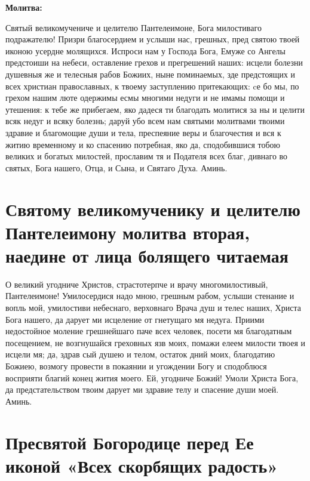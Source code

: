 \bfseries Молитва:\normalfont{}\nopagebreak


Святый великомучениче и целителю Пантелеимоне, Бога милостиваго подражателю! Призри благосердием и услыши нас, грешных, пред святою твоей иконою усердне молящихся. Испроси нам у Господа Бога, Емуже со Ангелы предстоиши на небеси, оставление грехов и прегрешений наших: исцели болезни душевныя же и телесныя рабов Божиих, ныне поминаемых, зде предстоящих и всех христиан православных, к твоему заступлению притекающих: cе бо мы, по грехом нашим люте одержимы есмы многими недуги и не имамы помощи и утешения: к тебе же прибегаем, яко дадеся ти благодать молитися за ны и целити всяк недуг и всяку болезнь; даруй убо всем нам святыми молитвами твоими здравие и благомощие души и тела, преспеяние веры и благочестия и вся к житию временному и ко спасению потребная, яко да, сподобившися тобою великих и богатых милостей, прославим тя и Подателя всех благ, дивнаго во святых, Бога нашего, Отца, и Сына, и Святаго Духа. Аминь.





\section{Святому великомученику и целителю Пантелеимону молитва вторая, наедине от лица болящего читаемая}
 


О великий угодниче Христов, страстотерпче и врачу многомилостивый, Пантелеимоне! Умилосердися надо мною, грешным рабом, услыши стенание и вопль мой, умилостиви небеснаго, верховнаго Врача душ и телес наших, Христа Бога нашего, да дарует ми исцеление от гнетущаго мя недуга. Приими недостойное моление грешнейшаго паче всех человек, посети мя благодатным посещением, не возгнушайся греховных язв моих, помажи елеем милости твоея и исцели мя; да, здрав сый душею и телом, остаток дний моих, благодатию Божиею, возмогу провести в покаянии и угождении Богу и сподоблюся восприяти благий конец жития моего. Ей, угодниче Божий! Умоли Христа Бога, да предстательством твоим дарует ми здравие телу и спасение души моей. Аминь.





\section{Пресвятой Богородице перед Ее иконой  «Всех скорбящих радость»}
 



